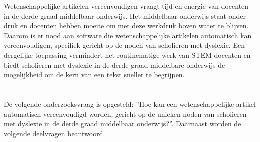 Wetenschappelijke artikelen vereenvoudigen vraagt tijd en energie van docenten in de derde graad middelbaar onderwijs. Het middelbaar onderwijs staat onder druk en docenten hebben moeite om met deze werkdruk boven water te blijven. Daarom is er nood aan software die wetenschappelijke artikelen automatisch kan vereenvoudigen, specifiek gericht op de noden van scholieren met dyslexie. Een dergelijke toepassing vermindert het routinematige werk van STEM-docenten en biedt scholieren met dyslexie in de derde graad middelbare onderwijs de mogelijkheid om de kern van een tekst sneller te begrijpen.

\section{}%
\label{sec:onderzoeksvraag}



De volgende onderzoeksvraag is opgesteld: ”Hoe kan een wetenschappelijke artikel automatisch vereenvoudigd worden, gericht op de unieken noden van scholieren met dyslexie in de derde graad middelbaar onderwijs?”. Daarnaast worden de volgende deelvragen beantwoord.

